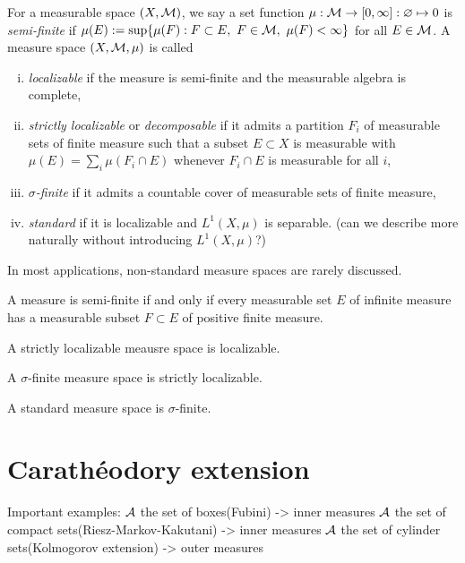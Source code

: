 \documentclass{../../large}
\begin{document}
\begin{prb}
For a measurable space $(X,\mathcal{M})$, we say a set function $\mu:\mathcal{M}\to[0,\infty]:\varnothing\mapsto0$ is \emph{semi-finite} if $\mu(E):=\sup\{\mu(F):F\subset E,\ F\in\cM,\ \mu(F)<\infty\}$ for all $E\in\mathcal{M}$.
A measure space $(X,\mathcal{M},\mu)$ is called
\begin{enumerate}[(i)]
\item \emph{localizable} if the measure is semi-finite and the measurable algebra is complete,
\item \emph{strictly localizable} or \emph{decomposable} if it admits a partition $F_i$ of measurable sets of finite measure such that a subset $E\subset X$ is measurable with $\mu(E)=\sum_i\mu(F_i\cap E)$ whenever $F_i\cap E$ is measurable for all $i$,
\item \emph{$\sigma$-finite} if it admits a countable cover of measurable sets of finite measure,
\item \emph{standard} if it is localizable and $L^1(X,\mu)$ is separable. (can we describe more naturally without introducing $L^1(X,\mu)$?)
\end{enumerate}
In most applications, non-standard measure spaces are rarely discussed.
\begin{parts}
\item A measure is semi-finite if and only if every measurable set $E$ of infinite measure has a measurable subset $F\subset E$ of positive finite measure.
\item A strictly localizable meausre space is localizable.
\item A $\sigma$-finite measure space is strictly localizable.
\item A standard measure space is $\sigma$-finite.
\end{parts}
\end{prb}


\begin{prb}
\end{prb}


\section{Carath\'eodory extension}

Important examples:
$\mathcal{A}$ the set of boxes(Fubini) -> inner measures
$\mathcal{A}$ the set of compact sets(Riesz-Markov-Kakutani) -> inner measures
$\mathcal{A}$ the set of cylinder sets(Kolmogorov extension) -> outer measures
\end{document}
